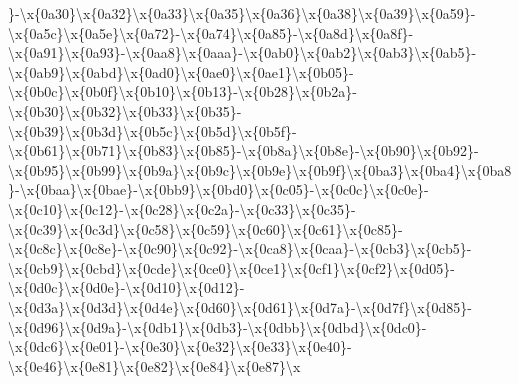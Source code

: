 \begin{DoxyCompactItemize}
\}-\/\textbackslash{}x\{0a30\}\textbackslash{}x\{0a32\}\textbackslash{}x\{0a33\}\textbackslash{}x\{0a35\}\textbackslash{}x\{0a36\}\textbackslash{}x\{0a38\}\textbackslash{}x\{0a39\}\textbackslash{}x\{0a59\}-\/\textbackslash{}x\{0a5c\}\textbackslash{}x\{0a5e\}\textbackslash{}x\{0a72\}-\/\textbackslash{}x\{0a74\}\textbackslash{}x\{0a85\}-\/\textbackslash{}x\{0a8d\}\textbackslash{}x\{0a8f\}-\/\textbackslash{}x\{0a91\}\textbackslash{}x\{0a93\}-\/\textbackslash{}x\{0aa8\}\textbackslash{}x\{0aaa\}-\/\textbackslash{}x\{0ab0\}\textbackslash{}x\{0ab2\}\textbackslash{}x\{0ab3\}\textbackslash{}x\{0ab5\}-\/\textbackslash{}x\{0ab9\}\textbackslash{}x\{0abd\}\textbackslash{}x\{0ad0\}\textbackslash{}x\{0ae0\}\textbackslash{}x\{0ae1\}\textbackslash{}x\{0b05\}-\/\textbackslash{}x\{0b0c\}\textbackslash{}x\{0b0f\}\textbackslash{}x\{0b10\}\textbackslash{}x\{0b13\}-\/\textbackslash{}x\{0b28\}\textbackslash{}x\{0b2a\}-\/\textbackslash{}x\{0b30\}\textbackslash{}x\{0b32\}\textbackslash{}x\{0b33\}\textbackslash{}x\{0b35\}-\/\textbackslash{}x\{0b39\}\textbackslash{}x\{0b3d\}\textbackslash{}x\{0b5c\}\textbackslash{}x\{0b5d\}\textbackslash{}x\{0b5f\}-\/\textbackslash{}x\{0b61\}\textbackslash{}x\{0b71\}\textbackslash{}x\{0b83\}\textbackslash{}x\{0b85\}-\/\textbackslash{}x\{0b8a\}\textbackslash{}x\{0b8e\}-\/\textbackslash{}x\{0b90\}\textbackslash{}x\{0b92\}-\/\textbackslash{}x\{0b95\}\textbackslash{}x\{0b99\}\textbackslash{}x\{0b9a\}\textbackslash{}x\{0b9c\}\textbackslash{}x\{0b9e\}\textbackslash{}x\{0b9f\}\textbackslash{}x\{0ba3\}\textbackslash{}x\{0ba4\}\textbackslash{}x\{0ba8\}-\/\textbackslash{}x\{0baa\}\textbackslash{}x\{0bae\}-\/\textbackslash{}x\{0bb9\}\textbackslash{}x\{0bd0\}\textbackslash{}x\{0c05\}-\/\textbackslash{}x\{0c0c\}\textbackslash{}x\{0c0e\}-\/\textbackslash{}x\{0c10\}\textbackslash{}x\{0c12\}-\/\textbackslash{}x\{0c28\}\textbackslash{}x\{0c2a\}-\/\textbackslash{}x\{0c33\}\textbackslash{}x\{0c35\}-\/\textbackslash{}x\{0c39\}\textbackslash{}x\{0c3d\}\textbackslash{}x\{0c58\}\textbackslash{}x\{0c59\}\textbackslash{}x\{0c60\}\textbackslash{}x\{0c61\}\textbackslash{}x\{0c85\}-\/\textbackslash{}x\{0c8c\}\textbackslash{}x\{0c8e\}-\/\textbackslash{}x\{0c90\}\textbackslash{}x\{0c92\}-\/\textbackslash{}x\{0ca8\}\textbackslash{}x\{0caa\}-\/\textbackslash{}x\{0cb3\}\textbackslash{}x\{0cb5\}-\/\textbackslash{}x\{0cb9\}\textbackslash{}x\{0cbd\}\textbackslash{}x\{0cde\}\textbackslash{}x\{0ce0\}\textbackslash{}x\{0ce1\}\textbackslash{}x\{0cf1\}\textbackslash{}x\{0cf2\}\textbackslash{}x\{0d05\}-\/\textbackslash{}x\{0d0c\}\textbackslash{}x\{0d0e\}-\/\textbackslash{}x\{0d10\}\textbackslash{}x\{0d12\}-\/\textbackslash{}x\{0d3a\}\textbackslash{}x\{0d3d\}\textbackslash{}x\{0d4e\}\textbackslash{}x\{0d60\}\textbackslash{}x\{0d61\}\textbackslash{}x\{0d7a\}-\/\textbackslash{}x\{0d7f\}\textbackslash{}x\{0d85\}-\/\textbackslash{}x\{0d96\}\textbackslash{}x\{0d9a\}-\/\textbackslash{}x\{0db1\}\textbackslash{}x\{0db3\}-\/\textbackslash{}x\{0dbb\}\textbackslash{}x\{0dbd\}\textbackslash{}x\{0dc0\}-\/\textbackslash{}x\{0dc6\}\textbackslash{}x\{0e01\}-\/\textbackslash{}x\{0e30\}\textbackslash{}x\{0e32\}\textbackslash{}x\{0e33\}\textbackslash{}x\{0e40\}-\/\textbackslash{}x\{0e46\}\textbackslash{}x\{0e81\}\textbackslash{}x\{0e82\}\textbackslash{}x\{0e84\}\textbackslash{}x\{0e87\}\textbackslash{}x\
\end{DoxyCompactItemize}
